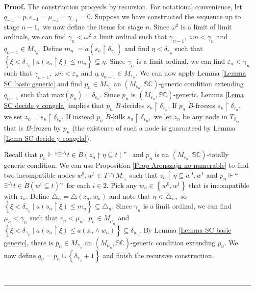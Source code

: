 \documentclass{article}
\newenvironment{proof}[1][Proof]{\noindent\textbf{#1.} }{\ \rule{0.5em}{0.5em}}
\begin{document}
\begin{proof}
The construction proceeds by recursion. For notational convenience, let
$q_{-1}=p,\varepsilon_{-1}=\mu_{-1}=\gamma_{-1}=0.$ Suppose we have
constructed the sequence up to stage $n-1,$ we now define the items for stage
$n.$ Since $\omega^{2}$ is a limit of limit ordinals, we can find $\gamma
_{n}<\omega^{2}$ a limit ordinal such that $\gamma_{n-1},$ $\omega
n<\gamma_{n}$ and $q_{n-1}\in M_{\gamma_{n}}.$ Define $m_{n}$ $=a(s_{n}%
\upharpoonright\delta_{\gamma_{n}})$ and find $\eta<\delta_{\gamma_{n}}$ such
that $\left\{  \xi<\delta_{\gamma_{n}}\mid a\left(  s_{n}\upharpoonright
\xi\right)  \leq m_{n}\right\}  \subseteq\eta.$ Since $\gamma_{n}$ is a limit
ordinal, we can find $\varepsilon_{n}<\gamma_{n}$ such that $\gamma_{n-1},$
$\omega n<\varepsilon_{n}$ and $\eta,q_{n-1}\in M_{\varepsilon_{n}}.$ We can
now apply Lemma \ref{Lemma SC basic generic} and find $p_{n}\in M_{\gamma_{n}%
}$ an $(M_{\varepsilon_{n}},\mathbb{SC})$-generic condition extending
$q_{n-1}$ such that \textsf{max}$\left(  p_{n}\right)  =\delta_{\varepsilon
_{n}}.$ Since $p_{n}$ is $(M_{\varepsilon_{n}},\mathbb{SC})$-generic, Lemma
\ref{Lema SC decide y congela} implies that $p_{n}$ $\dot{B}$-decides
$s_{n}\upharpoonright\delta_{\varepsilon_{n}}.$ If $p_{n}$ $\dot{B}$-freezes
$s_{n}\upharpoonright\delta_{\varepsilon_{n}},$ we set $z_{n}=s_{n}%
\upharpoonright\delta_{\varepsilon_{n}}.$ If instead $p_{n}$ $\dot{B}$-kills
$s_{n}\upharpoonright\delta_{\varepsilon_{n}},$ we let $z_{n}$ be any node in
$T_{\delta_{\varepsilon_{n}}}$ that is $\dot{B}$-frozen by $p_{n}$ (the
existence of such a node is guaranteed by Lemma \ref{Lema SC decide y congela}).

\qquad\qquad\qquad

Recall that $p_{n}\Vdash$\textquotedblleft$\exists^{\omega_{1}}t\in\dot
{B}\left(  z_{n}\upharpoonright\eta\subseteq t\right)  $\textquotedblright%
\ and $p_{n}$ is an $(M_{\varepsilon_{n}},\mathbb{SC})$-totally generic
condition. We can use Proposition \ref{Prop Aronszajn no numerable} to find
two incompatible nodes $w^{0},w^{1}\in T\cap M_{\varepsilon_{n}}$ such that
$z_{n}\upharpoonright\eta\subseteq w^{0},w^{1}$ and $p_{n}\Vdash
$\textquotedblleft$\exists^{\omega_{1}}t\in\dot{B}\left(  w^{i}\subseteq
t\right)  $\textquotedblright\ for each $i\in2.$ Pick any $w_{n}\in\left\{
w^{0},w^{1}\right\}  $ that is incompatible with $z_{n}.$ Define
$\triangle_{n}=\triangle\left(  z_{n},w_{n}\right)  $ and note that
$\eta<\triangle_{n},$ so $\left\{  \xi<\delta_{\gamma_{n}}\mid a\left(
s_{n}\upharpoonright\xi\right)  \leq m_{n}\right\}  \subseteq\triangle_{n}.$
Since $\gamma_{n}$ is a limit ordinal, we can find $\mu_{n}<\gamma_{n}$ such
that $\varepsilon_{n}<\mu_{n},$ $p_{n}\in M_{\mu_{n}}$ and $\left\{
\xi<\delta_{\gamma_{n}}\mid a\left(  s_{n}\upharpoonright\xi\right)  \leq
a\left(  z_{n}\wedge w_{n}\right)  \right\}  \subseteq\delta_{\mu_{n}}.$ By
Lemma \ref{Lemma SC basic generic}, there is $\overline{p}_{n}\in
M_{\gamma_{n}}$ an $(M_{\mu_{n}},\mathbb{SC})$-generic condition extending
$p_{n}.$ We now define $q_{n}=\overline{p}_{n}\cup\left\{  \delta_{\gamma_{n}%
}+1\right\}  $ and finish the recursive construction.


\end{proof}
\end{document}
